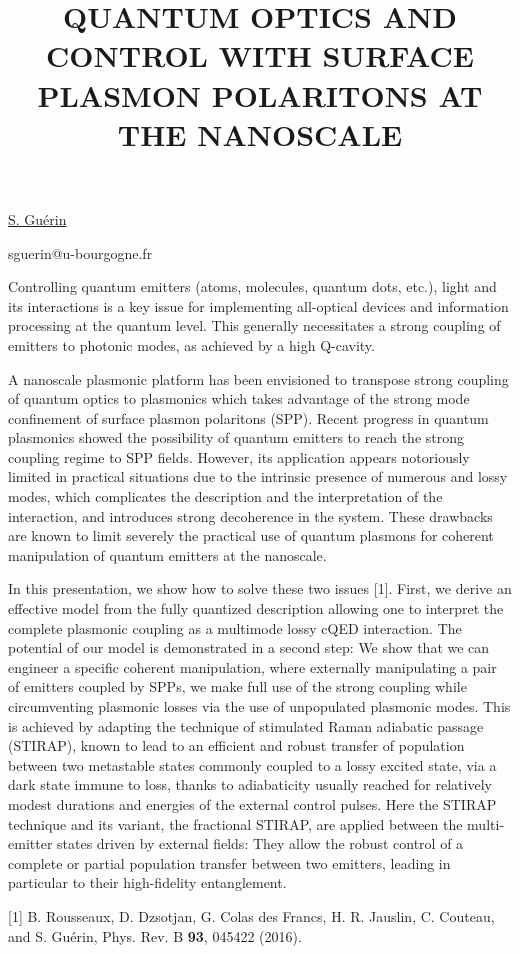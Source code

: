 \title{QUANTUM OPTICS AND CONTROL WITH SURFACE PLASMON POLARITONS AT THE NANOSCALE}

\underline{S. Gu\'{e}rin} 

{\normalsize{\vspace{-4mm}
\dijon

\email sguerin@u-bourgogne.fr}}

Controlling quantum emitters (atoms, molecules, quantum dots, etc.), light and its interactions is a key issue for implementing all-optical
devices and information processing at the quantum level. This generally necessitates a strong coupling of emitters to photonic
modes, as achieved by a high Q-cavity.

A nanoscale plasmonic platform has been envisioned to transpose strong coupling of quantum optics to plasmonics which takes
advantage of the strong mode confinement of surface plasmon polaritons (SPP). Recent progress in quantum plasmonics showed the
possibility of quantum emitters to reach the strong coupling regime to SPP fields. However, its application appears notoriously
limited in practical situations due to the intrinsic presence of numerous and lossy modes, which complicates the description and the
interpretation of the interaction, and introduces strong decoherence in the system. These drawbacks are known to limit severely the
practical use of quantum plasmons for coherent manipulation of quantum emitters at the nanoscale.

In this presentation, we show how to solve these two issues [1]. First, we derive an effective model from the fully quantized
description allowing one to interpret the complete plasmonic coupling as a multimode lossy cQED interaction. The potential of our
model is demonstrated in a second step: We show that we can engineer a specific coherent manipulation, where externally
manipulating a pair of emitters coupled by SPPs, we make full use of the strong coupling while circumventing plasmonic losses via
the use of unpopulated plasmonic modes. This is achieved by adapting the technique of stimulated Raman adiabatic passage
(STIRAP), known to lead to an efficient and robust transfer of population between two metastable states commonly coupled to a lossy
excited state, via a dark state immune to loss, thanks to adiabaticity usually reached for relatively modest durations and energies of
the external control pulses. Here the STIRAP technique and its variant, the fractional STIRAP, are applied between the multi-emitter
states driven by external fields: They allow the robust control of a complete or partial population transfer between two emitters,
leading in particular to their high-fidelity entanglement.

{\normalsize
[1] B. Rousseaux, D. Dzsotjan, G. Colas des Francs, H. R. Jauslin, C. Couteau, and S. Gu\'{e}rin, Phys. Rev. B \textbf{93}, 045422 (2016).
%
%
}



\vspace{\baselineskip} 